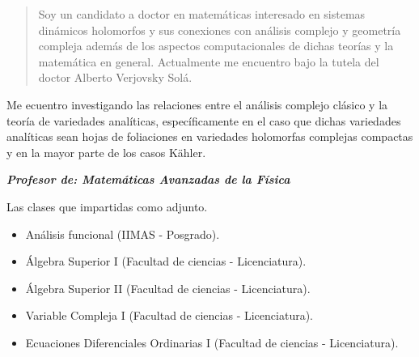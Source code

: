 \documentclass[10pt,a4paper,ragged2e,withhyper]{altacv}
\author{Carlos Eduardo Martínez Aguilar}
\date{\today}
\title{}
\begin{document}
\label{sec:org4cd40ff}

\makecvheader


\label{sec:org2638204}
\begin{paracol}{2}
\begin{quote}
Soy un candidato a doctor en matemáticas interesado en sistemas dinámicos holomorfos y sus conexiones con análisis complejo y geometría compleja además de los aspectos computacionales de dichas teorías y la matemática en general. Actualmente me encuentro bajo la tutela del doctor Alberto Verjovsky Solá.
\end{quote}


Me ecuentro investigando las relaciones entre el análisis complejo clásico y la teoría de variedades analíticas, específicamente en el caso que dichas variedades analíticas sean hojas de foliaciones en variedades holomorfas complejas compactas y en la mayor parte de los casos Kähler.


\par\divider
{}
\textbf{\emph{Profesor de: Matemáticas Avanzadas de la Física}}

Las clases que impartidas como adjunto. 
\begin{itemize}
\item Análisis funcional (IIMAS - Posgrado).
\item Álgebra Superior I (Facultad de ciencias - Licenciatura).
\item Álgebra Superior II (Facultad de ciencias - Licenciatura).
\item Variable Compleja I (Facultad de ciencias - Licenciatura).
\item Ecuaciones Diferenciales Ordinarias I (Facultad de ciencias - Licenciatura).
\end{itemize}


\end{paracol}
\end{document}
